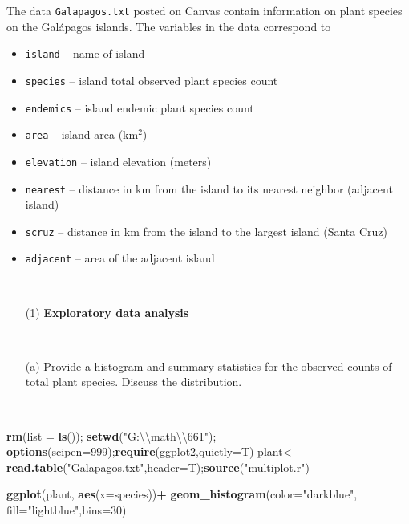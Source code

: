\documentclass[]{article}
\newenvironment{Shaded}{\begin{snugshade}}{\end{snugshade}}
\newcommand{\KeywordTok}[1]{\textcolor[rgb]{0.13,0.29,0.53}{\textbf{#1}}}
\newcommand{\DataTypeTok}[1]{\textcolor[rgb]{0.13,0.29,0.53}{#1}}
\newcommand{\DecValTok}[1]{\textcolor[rgb]{0.00,0.00,0.81}{#1}}
\newcommand{\CharTok}[1]{\textcolor[rgb]{0.31,0.60,0.02}{#1}}
\newcommand{\StringTok}[1]{\textcolor[rgb]{0.31,0.60,0.02}{#1}}
\newcommand{\OperatorTok}[1]{\textcolor[rgb]{0.81,0.36,0.00}{\textbf{#1}}}
\newcommand{\NormalTok}[1]{#1}
\begin{document}
The data \verb|Galapagos.txt| posted on Canvas contain information on
plant species on the Galápagos islands. The variables in the data
correspond to

\begin{itemize}
\item {\tt island} -- name of island  \ 
\item {\tt species} -- island total observed plant species count  \ 
\item {\tt endemics} -- island endemic plant species count  \ 
\item {\tt area} -- island area (km$^2$)  \ 
\item {\tt elevation} -- island elevation (meters)  \ 
\item {\tt nearest} -- distance in km from the island to its nearest neighbor (adjacent island)  \ 
\item {\tt scruz} -- distance in km from the island to the largest island (Santa Cruz)  \ 
\item {\tt adjacent} -- area of the adjacent island \\
\end{itemize}

~

\begin{itemize}
\item[(1)] {\bf Exploratory data analysis}
\end{itemize}

~

\begin{itemize}
\item[(a)] Provide a histogram and summary statistics for the observed counts of total plant species.  Discuss the distribution.  
\end{itemize}

~

\begin{Shaded}
\begin{Highlighting}[]
\KeywordTok{rm}\NormalTok{(}\DataTypeTok{list =} \KeywordTok{ls}\NormalTok{()); }\KeywordTok{setwd}\NormalTok{(}\StringTok{"G:}\CharTok{\textbackslash{}\textbackslash{}}\StringTok{math}\CharTok{\textbackslash{}\textbackslash{}}\StringTok{661"}\NormalTok{); }\KeywordTok{options}\NormalTok{(}\DataTypeTok{scipen=}\DecValTok{999}\NormalTok{);}\KeywordTok{require}\NormalTok{(ggplot2,}\DataTypeTok{quietly=}\NormalTok{T)}
\NormalTok{plant<-}\KeywordTok{read.table}\NormalTok{(}\StringTok{"Galapagos.txt"}\NormalTok{,}\DataTypeTok{header=}\NormalTok{T);}\KeywordTok{source}\NormalTok{(}\StringTok{"multiplot.r"}\NormalTok{)  }

\KeywordTok{ggplot}\NormalTok{(plant, }\KeywordTok{aes}\NormalTok{(}\DataTypeTok{x=}\NormalTok{species))}\OperatorTok{+}\StringTok{  }\KeywordTok{geom_histogram}\NormalTok{(}\DataTypeTok{color=}\StringTok{"darkblue"}\NormalTok{, }\DataTypeTok{fill=}\StringTok{"lightblue"}\NormalTok{,}\DataTypeTok{bins=}\DecValTok{30}\NormalTok{)}
\end{Highlighting}
\end{Shaded}
\end{document}
